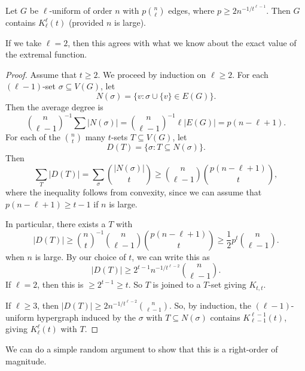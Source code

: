 \documentclass[a4paper]{article}
\begin{document}
\begin{thm}[Erd\"os]
  Let $G$ be $\ell$-uniform of order $n$ with $p \binom{n}{\ell}$ edges, where $p \geq 2n^{-1/t^{\ell - 1}}$. Then $G$ contains $K_{\ell}^{\ell}(t)$ (provided $n$ is large).
\end{thm}
If we take $\ell = 2$, then this agrees with what we know about the exact value of the extremal function.

\begin{proof}
  Assume that $t \geq 2$. We proceed by induction on $\ell \geq 2$. For each $(\ell - 1)$-set $\sigma \subseteq V(G)$, let
  \[
    N(\sigma) = \{v: \sigma \cup \{v\} \in E(G)\}.
  \]
  Then the average degree is
  \[
    \binom{n}{\ell - 1}^{-1} \sum |N(\sigma)| = \binom{n}{\ell - 1}^{-1} \ell |E(G)| = p (n - \ell + 1).
  \]
  For each of the $\binom{n}{t}$ many $t$-sets $T \subseteq V(G)$, let
  \[
    D(T) = \{\sigma : T \subseteq N(\sigma)\}.
  \]
  Then
  \[
    \sum_T |D(T)| = \sum_\sigma \binom{|N(\sigma)|}{t} \geq \binom{n}{\ell - 1} \binom{p(n - \ell + 1)}{t},
  \]
  where the inequality follows from convexity, since we can assume that $p(n - \ell + 1) \geq t - 1$ if $n$ is large.

  In particular, there exists a $T$ with
  \[
    |D(T)| \geq \binom{n}{t}^{-1} \binom{n}{\ell - 1} \binom{p(n - \ell + 1)}{t} \geq \frac{1}{2} p^t \binom{n}{\ell - 1}.
  \]
  when $n$ is large. By our choice of $t$, we can write this as
  \[
    |D(T)| \geq 2^{t - 1} n^{-1/t^{\ell - 2}} \binom{n}{\ell - 1}.
  \]
  If $\ell = 2$, then this is $\geq 2^{t - 1} \geq t$. So $T$ is joined to a $T$-set giving $K_{t, t}$.

  If $\ell \geq 3$, then $|D(T)| \geq 2 n^{-1/t^{\ell - 2}} \binom{n}{\ell - 1}$. So, by induction, the $(\ell - 1)$-uniform hypergraph induced by the $\sigma$ with $T \subseteq N(\sigma)$ contains $K_{\ell - 1}^{\ell - 1}(t)$, giving $K_{\ell}^\ell(t)$ with $T$.
\end{proof}
We can do a simple random argument to show that this is a right-order of magnitude.

\printindex
\end{document}
